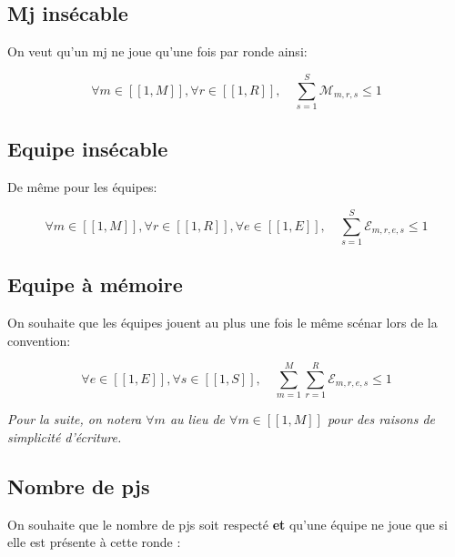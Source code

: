 \documentclass[11pt,a4paper]{article}
\begin{document}
\subsection*{Mj insécable}

On veut qu'un mj ne joue qu'une fois par ronde ainsi:

\begin{equation}
	\forall m \in [\![ 1, M]\!], \forall r \in [\![ 1, R ]\!],\quad  \sum_{s=1}^S \mathcal{M}_{m,r,s} \leq 1 
\end{equation}


\subsection*{Equipe insécable}

De même pour les équipes:

\begin{equation}
	\forall m \in [\![ 1, M]\!],\forall r \in [\![ 1, R ]\!],  \forall e \in [\![ 1, E ]\!], \quad \sum_{s=1}^S \mathcal{E}_{m,r,e,s} \leq 1 
\end{equation}

\subsection*{Equipe à mémoire}

On souhaite que les équipes jouent au plus une fois le même scénar lors de la convention:

\begin{equation}
	\forall e \in [\![ 1, E ]\!], \forall s \in [\![ 1, S ]\!], \quad \sum_{m=1}^M\sum_{r=1}^R \mathcal{E}_{m,r,e,s} \leq 1
\end{equation}

\emph{Pour la suite, on notera $\forall m$ au lieu de $\forall m \in [\![ 1, M]\!]$ pour des raisons de simplicité d'écriture.}

\subsection*{Nombre de pjs}

On souhaite que le nombre de pjs soit respecté \textbf{et} qu'une équipe ne joue que si elle est présente à cette ronde :
\end{document}

